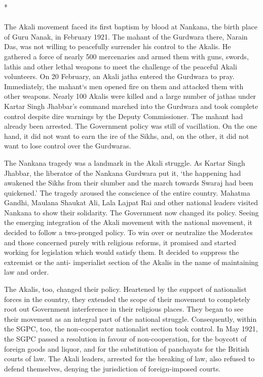 \begin{center}*\end{center}

\paragraph*{}

The Akali movement faced its first baptism by blood at Nankana, the birth place of Guru Nanak, in February 1921. The mahant of the Gurdwara there, Narain Das, was not willing to peacefully surrender his control to the Akalis. He gathered a force of nearly 500 mercenaries and armed them with guns, swords, lathis and other lethal weapons to meet the challenge of the peaceful Akali volunteers. On 20 February, an Akali jatha entered the Gurdwara to pray. Immediately, the mahant`s men opened fire on them and attacked them with other weapons. Nearly 100 Akalis were killed and a large number of jathas under Kartar Singh Jhabbar's command marched into the Gurdwara and took complete control despite dire warnings by the Deputy Commissioner. The mahant had already been arrested. The Government policy was still of vacillation. On the one hand, it did not want to earn the ire of the Sikhs, and, on the other, it did not want to lose control over the Gurdwaras.

The Nankana tragedy was a landmark in the Akali struggle. As Kartar Singh Jhabbar, the liberator of the Nankana Gurdwara put it, `the happening had awakened the Sikhs from their slumber and the march towards Swaraj had been quickened.' The tragedy aroused the conscience of the entire country. Mahatma Gandhi, Maulana Shaukat Ali, Lala Lajpat Rai and other national leaders visited Nankana to show their solidarity. The Government now changed its policy. Seeing the emerging integration of the Akali movement with the national movement, it decided to follow a two-pronged policy. To win over or neutralize the Moderates and those concerned purely with religious reforms, it promised and started working for legislation which would satisfy them. It decided to suppress the extremist or the anti- imperialist section of the Akalis in the name of maintaining law and order.

The Akalis, too, changed their policy. Heartened by the support of nationalist forces in the country, they extended the scope of their movement to completely root out Government interference in their religious places. They began to see their movement as an integral part of the national struggle. Consequently, within the SGPC, too, the non-cooperator nationalist section took control. In May 1921, the SGPC passed a resolution in favour of non-cooperation, for the boycott of foreign goods and liquor, and for the substitution of panchayats for the British courts of law. The Akali leaders, arrested for the breaking of law, also refused to defend themselves, denying the jurisdiction of foreign-imposed courts.

